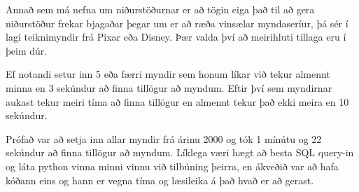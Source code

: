 \documentclass[12pt, git, draft]{rureport}
\begin{document}
Annað sem má nefna um niðurstöðurnar er að tögin eiga það til að gera niðurstöður frekar bjagaðar þegar um er að ræða vinsælar myndaseríur, þá sér í lagi teiknimyndir frá Pixar eða Disney. Þær valda því að meirihluti tillaga eru í þeim dúr.

Ef notandi setur inn 5 eða færri myndir sem honum líkar við tekur almennt minna en 3 sekúndur að finna tillögur að myndum. Eftir því sem myndirnar aukast tekur meiri tíma að finna tillögur en almennt tekur það ekki meira en 10 sekúndur.

Prófað var að setja inn allar myndir frá árinu 2000 og tók 1 mínútu og 22 sekúndur að finna tillögur að myndum. Líklega væri hægt að besta SQL query-in og láta python vinna minni vinnu við tilbúning þeirra, en ákveðið var að hafa kóðann eins og hann er vegna tíma og læsileika á það hvað er að gerast.
\end{document}

